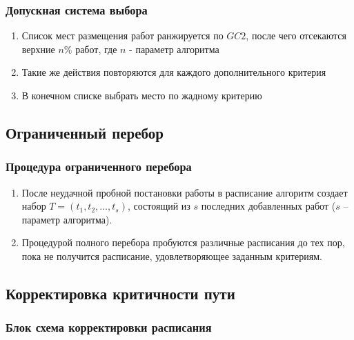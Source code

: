 \begin{frame}
    \frametitle{Допускная система выбора}
    \begin{enumerate}
        \item Список мест размещения работ ранжируется по $GC2$, после чего отсекаются верхние $n\%$ работ, где $n$ - параметр алгоритма
        \item Такие же действия повторяются для каждого дополнительного критерия
        \item В конечном списке выбрать место по жадному критерию
    \end{enumerate}

\end{frame}


\subsection{Ограниченный перебор}
\begin{frame}
    \frametitle{Процедура ограниченного перебора}
    \begin{enumerate}
        \item После неудачной пробной постановки работы в расписание алгоритм создает набор $T=\left( t_1,t_2,\dots,t_s \right)$, состоящий из $s$ последних добавленных работ ($s$ – параметр алгоритма).
        \item Процедурой полного перебора пробуются различные расписания до тех пор, пока не получится расписание, удовлетворяющее заданным критериям.
    \end{enumerate}
\end{frame}

\subsection{Корректировка критичности пути}
\begin{frame}
    \frametitle{Блок схема корректировки расписания}
    {\tiny
    }
\end{frame}
